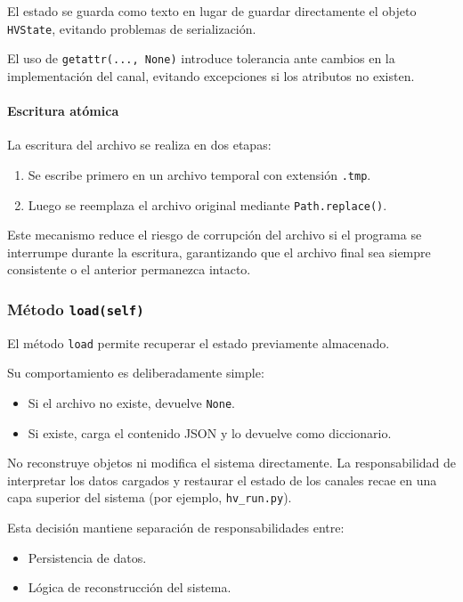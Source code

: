 \documentclass{article}
\begin{document}
El estado se guarda como texto en lugar de guardar directamente el objeto
\texttt{HVState}, evitando problemas de serialización.

El uso de \texttt{getattr(..., None)} introduce tolerancia ante cambios en la
implementación del canal, evitando excepciones si los atributos no existen.

\paragraph{Escritura atómica}

La escritura del archivo se realiza en dos etapas:

\begin{enumerate}
    \item Se escribe primero en un archivo temporal con extensión \texttt{.tmp}.
    \item Luego se reemplaza el archivo original mediante \texttt{Path.replace()}.
\end{enumerate}

Este mecanismo reduce el riesgo de corrupción del archivo si el programa se
interrumpe durante la escritura, garantizando que el archivo final sea
siempre consistente o el anterior permanezca intacto.

\subsubsection{Método \texttt{load(self)}}

El método \texttt{load} permite recuperar el estado previamente almacenado.

Su comportamiento es deliberadamente simple:

\begin{itemize}
    \item Si el archivo no existe, devuelve \texttt{None}.
    \item Si existe, carga el contenido JSON y lo devuelve como diccionario.
\end{itemize}

No reconstruye objetos ni modifica el sistema directamente.  
La responsabilidad de interpretar los datos cargados y restaurar el estado
de los canales recae en una capa superior del sistema (por ejemplo,
\texttt{hv\_run.py}).

Esta decisión mantiene separación de responsabilidades entre:

\begin{itemize}
    \item Persistencia de datos.
    \item Lógica de reconstrucción del sistema.
\end{itemize}
\end{document}
